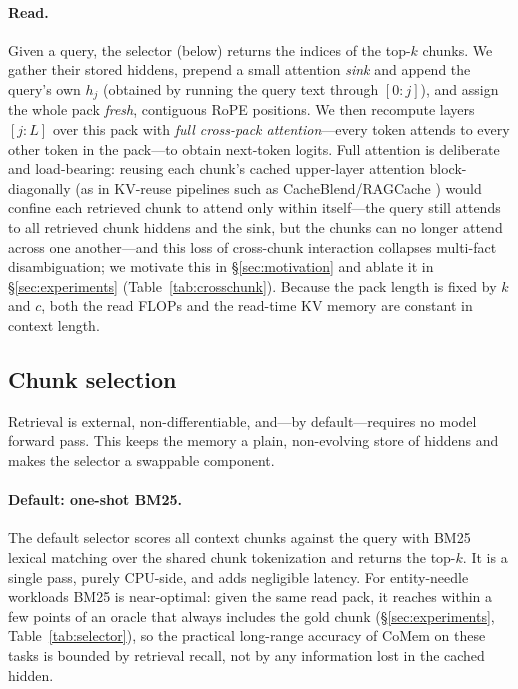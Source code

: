 \paragraph{Read.} Given a query, the selector (below) returns the indices of the
top-$k$ chunks. We gather their stored hiddens, prepend a small attention
\emph{sink} and append the query's own $h_j$ (obtained by running the query text
through $[0{:}j]$), and assign the whole pack \emph{fresh}, contiguous RoPE
positions. We then recompute layers $[j{:}L]$ over this pack with
\emph{full cross-pack attention}---every token attends to every other token in
the pack---to obtain next-token logits. Full attention is deliberate and
load-bearing: reusing each chunk's cached upper-layer attention block-diagonally
(as in KV-reuse pipelines such as CacheBlend/RAGCache \citep{cacheblend,ragcache})
would confine each retrieved chunk to attend only within itself---the query
still attends to all retrieved chunk hiddens and the sink, but the chunks can no
longer attend across one another---and this loss of cross-chunk interaction
collapses multi-fact disambiguation; we motivate this in \S\ref{sec:motivation}
and ablate it in \S\ref{sec:experiments} (Table~\ref{tab:crosschunk}). Because the pack
length is fixed by $k$ and $c$, both the read FLOPs and the read-time KV memory
are constant in context length.

\subsection{Chunk selection}
\label{subsec:selector}
Retrieval is external, non-differentiable, and---by default---requires no model
forward pass. This keeps the memory a plain, non-evolving store of hiddens and
makes the selector a swappable component.

\paragraph{Default: one-shot BM25.} The default selector scores all context
chunks against the query with BM25 lexical matching over the shared chunk
tokenization and returns the top-$k$. It is a single pass, purely CPU-side, and
adds negligible latency. For entity-needle workloads BM25 is near-optimal:
given the same read pack, it reaches within a few points of an oracle that
always includes the gold chunk (\S\ref{sec:experiments},
Table~\ref{tab:selector}), so the practical long-range accuracy of CoMem on
these tasks is bounded by retrieval recall, not by any information lost in the
cached hidden.

